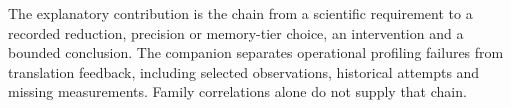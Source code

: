 The explanatory contribution is the chain from a scientific requirement to a recorded reduction, precision or memory-tier choice, an intervention and a bounded conclusion. The companion separates operational profiling failures from translation feedback, including selected observations, historical attempts and missing measurements. Family correlations alone do not supply that chain.
